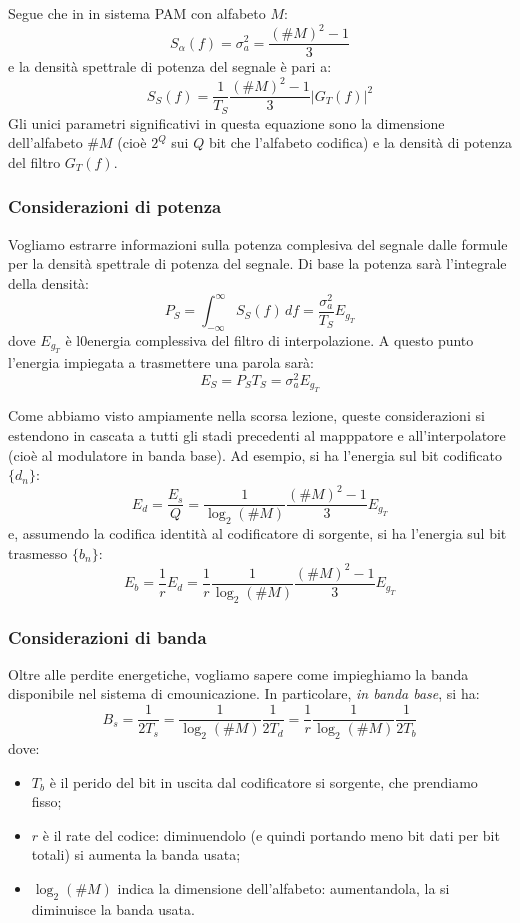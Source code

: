 \documentclass[a4paper,11pt]{article}
\begin{document}
Segue che in in sistema PAM con alfabeto $M$:
$$
S_\alpha(f) = \sigma_a^2 = \frac{(\# M)^2 - 1}{3}
$$
e la densità spettrale di potenza del segnale è pari a:
$$
S_S(f) = \frac{1}{T_S} \frac{(\# M)^2 - 1}{3} | G_T(f) |^2
$$
Gli unici parametri significativi in questa equazione sono la dimensione dell'alfabeto $\# M$ (cioè $2^Q$ sui $Q$ bit che l'alfabeto codifica) e la densità di potenza del filtro $G_T(f)$.

\subsubsection{Considerazioni di potenza}
Vogliamo estrarre informazioni sulla potenza complesiva del segnale dalle formule per la densità spettrale di potenza del segnale. Di base la potenza sarà l'integrale della densità:
$$
P_S = \int_{-\infty}^{\infty} S_S(f) \, df = \frac{\sigma_a^2}{T_S} E_{g_T} 
$$
dove $E_{g_T}$ è l0energia complessiva del filtro di interpolazione. A questo punto l'energia impiegata a trasmettere una parola sarà:
$$
E_S = P_S T_S = \sigma_a^2 E_{g_T} 
$$

Come abbiamo visto ampiamente nella scorsa lezione, queste considerazioni si estendono in cascata a tutti gli stadi precedenti al mapppatore e all'interpolatore (cioè al modulatore in banda base). Ad esempio, si ha l'energia sul bit codificato $\{d_n\}$:
$$
E_d = \frac{E_s}{Q} = \frac{1}{\log_2 (\# M)} \frac{(\# M)^2 - 1}{3} E_{g_T}
$$
e, assumendo la codifica identità al codificatore di sorgente, si ha l'energia sul bit trasmesso $\{b_n\}$:
$$
E_b = \frac{1}{r} E_d =  \frac{1}{r} \frac{1}{\log_2 (\# M)} \frac{(\# M)^2 - 1}{3} E_{g_T}
$$

\subsubsection{Considerazioni di banda}
Oltre alle perdite energetiche, vogliamo sapere come impieghiamo la banda disponibile nel sistema di cmounicazione. In particolare, \textit{in banda base}, si ha:
$$
B_s = \frac{1}{2 T_s} = \frac{1}{\log_2(\# M)} \frac{1}{2 T_d} = \frac{1}{r} \frac{1}{\log_2(\# M)} \frac{1}{2 T_b}
$$
dove:
\begin{itemize}
	\item $T_b$ è il perido del bit in uscita dal codificatore si sorgente, che prendiamo fisso; 
	\item $r$ è il rate del codice: diminuendolo (e quindi portando meno bit dati per bit totali) si aumenta la banda usata;
	\item $\log_2(\# M)$ indica la dimensione dell'alfabeto: aumentandola, la si diminuisce la banda usata.
\end{itemize}
\end{document}
